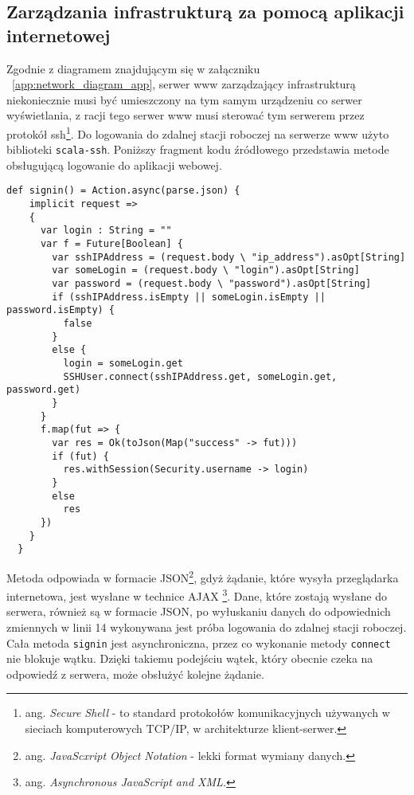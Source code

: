 \subsection{Zarządzania infrastrukturą za pomocą aplikacji internetowej}

Zgodnie z diagramem znajdującym się w załączniku ~\ref{app:network_diagram_app}, serwer www zarządzający infrastrukturą niekoniecznie musi być umieszczony na tym samym urządzeniu co serwer wyświetlania, z racji tego serwer www musi sterować tym serwerem przez protokół ssh\footnote{ang. \emph{Secure Shell} - to standard protokołów komunikacyjnych używanych w sieciach komputerowych TCP/IP, w architekturze klient-serwer.\cite{ssh-wiki}}.
Do logowania do zdalnej stacji roboczej na serwerze www użyto biblioteki \lstinline{scala-ssh}. Poniższy fragment kodu źródłowego przedstawia metode obsługującą logowanie do aplikacji webowej.

\begin{lstlisting}
def signin() = Action.async(parse.json) {
    implicit request =>
    {
      var login : String = ""
      var f = Future[Boolean] {
        var sshIPAddress = (request.body \ "ip_address").asOpt[String]
        var someLogin = (request.body \ "login").asOpt[String]
        var password = (request.body \ "password").asOpt[String]
        if (sshIPAddress.isEmpty || someLogin.isEmpty || password.isEmpty) {
          false
        }
        else {
          login = someLogin.get
          SSHUser.connect(sshIPAddress.get, someLogin.get, password.get)
        }
      }
      f.map(fut => {
        var res = Ok(toJson(Map("success" -> fut)))
        if (fut) {
          res.withSession(Security.username -> login)
        }
        else
          res
      })
    }
  }
\end{lstlisting}

Metoda odpowiada w formacie JSON\footnote{ang. \emph{JavaScxript Object Notation} - lekki format wymiany danych.}, gdyż żądanie, które wysyła przeglądarka internetowa, jest wysłane w technice AJAX \footnote{ang. \emph{Asynchronous JavaScript and XML.}}. Dane, które zostają wysłane do serwera, również są w formacie JSON, po wyłuskaniu danych do odpowiednich zmiennych w linii 14 wykonywana jest próba logowania do zdalnej stacji roboczej. Cała metoda \lstinline{signin} jest asynchroniczna, przez co wykonanie metody \lstinline{connect} nie blokuje wątku. Dzięki takiemu podejściu wątek, który obecnie czeka na odpowiedź z serwera, może obsłużyć kolejne żądanie.

\par

